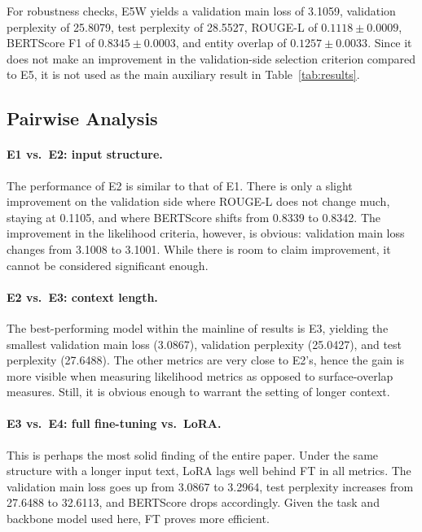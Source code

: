 \documentclass{article}
\newcommand{\expid}[1]{\textsc{#1}}
\begin{document}
For robustness checks, \expid{E5W} yields a validation main loss of 3.1059, validation perplexity of 25.8079, test perplexity of 28.5527, ROUGE-L of $0.1118 \pm 0.0009$, BERTScore F1 of $0.8345 \pm 0.0003$, and entity overlap of $0.1257 \pm 0.0033$. Since it does not make an improvement in the validation-side selection criterion compared to \expid{E5}, it is not used as the main auxiliary result in Table~\ref{tab:results}.

\subsection{Pairwise Analysis}

\paragraph{\expid{E1} vs.\ \expid{E2}: input structure.}
The performance of \expid{E2} is similar to that of \expid{E1}. There is only a slight improvement on the validation side where ROUGE-L does not change much, staying at 0.1105, and where BERTScore shifts from 0.8339 to 0.8342. The improvement in the likelihood criteria, however, is obvious: validation main loss changes from 3.1008 to 3.1001. While there is room to claim improvement, it cannot be considered significant enough.

\paragraph{\expid{E2} vs.\ \expid{E3}: context length.}
The best-performing model within the mainline of results is \expid{E3}, yielding the smallest validation main loss (3.0867), validation perplexity (25.0427), and test perplexity (27.6488). The other metrics are very close to \expid{E2}'s, hence the gain is more visible when measuring likelihood metrics as opposed to surface-overlap measures. Still, it is obvious enough to warrant the setting of longer context.

\paragraph{\expid{E3} vs.\ \expid{E4}: full fine-tuning vs.\ LoRA.}
This is perhaps the most solid finding of the entire paper. Under the same structure with a longer input text, LoRA lags well behind FT in all metrics. The validation main loss goes up from 3.0867 to 3.2964, test perplexity increases from 27.6488 to 32.6113, and BERTScore drops accordingly. Given the task and backbone model used here, FT proves more efficient.
\end{document}
